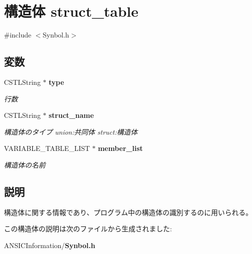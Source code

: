 \section{構造体 struct\_\-table}
\label{structstruct__table}


{\ttfamily \#include $<$Synbol.h$>$}

\subsection*{変数}
\begin{DoxyCompactItemize}
\item 
CSTLString $\ast$ {\bf type}\label{structstruct__table_aa24e637ea09371ee5332357c141541f2}

\begin{DoxyCompactList}\small\item\em 行数 \item\end{DoxyCompactList}\item 
CSTLString $\ast$ {\bf struct\_\-name}\label{structstruct__table_ac49bae1a4a5f05919ac8341b1406154d}

\begin{DoxyCompactList}\small\item\em 構造体のタイプ union:共同体 struct:構造体 \item\end{DoxyCompactList}\item 
VARIABLE\_\-TABLE\_\-LIST $\ast$ {\bf member\_\-list}\label{structstruct__table_af8a062298d679adae14b0303053d45a8}

\begin{DoxyCompactList}\small\item\em 構造体の名前 \item\end{DoxyCompactList}\end{DoxyCompactItemize}


\subsection{説明}
構造体に関する情報であり、プログラム中の構造体の識別するのに用いられる。 

この構造体の説明は次のファイルから生成されました:\begin{DoxyCompactItemize}
\item 
ANSICInformation/{\bf Synbol.h}\end{DoxyCompactItemize}
